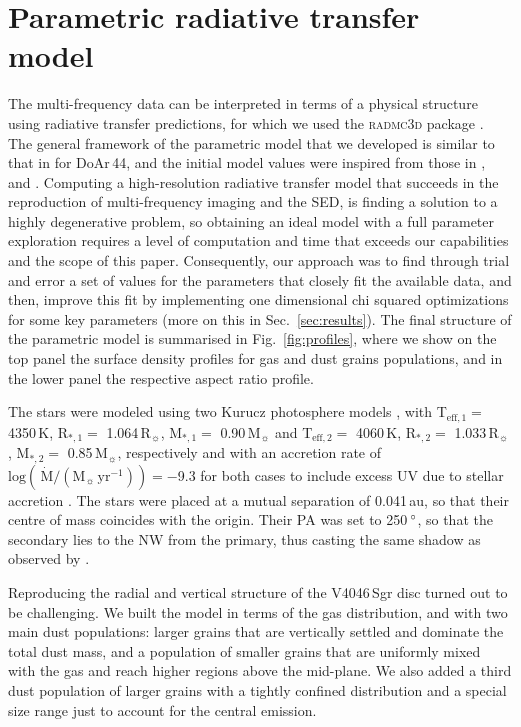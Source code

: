 \documentclass[fleqn,usenatbib,useAMS]{mnras}
\begin{document}
\section{Parametric radiative transfer model} \label{sec:model}

The multi-frequency data can be interpreted in terms of a physical structure using radiative transfer predictions, for which we used the \textsc{radmc3d} package \citep[version 2.0,][]{Dullemond_2012}. The general framework of the parametric model that we developed is similar to that in \citet{2018MNRAS.477.5104C} for DoAr\,44, and the initial model values were inspired from those in \citet{Rosenfeld_2013}, \citet{Ru_z_Rodr_guez_2019} and \citet{2019ApJ...882..160Q}. Computing a high-resolution radiative transfer model that succeeds in the reproduction of multi-frequency imaging and the SED, is finding a solution to a highly degenerative problem, so obtaining an ideal model with a full parameter exploration requires a level of computation and time that exceeds our capabilities and the scope of this paper. Consequently, our approach was to find through trial and error a set of values for the parameters that closely fit the available data, and then, improve this fit by implementing one dimensional chi squared optimizations for some key parameters (more on this in Sec.~\ref{sec:results}). The final structure of the parametric model is summarised in Fig.~\ref{fig:profiles}, where we show on the top panel the surface density profiles for gas and dust grains populations, and in the lower panel the respective aspect ratio profile.

The stars were modeled using two Kurucz photosphere models \citep{1979ApJS...40....1K, 1997A&A...318..841C}, with T$_{\mathrm{eff},1} =$ 4350\,K, R$_{*,1} =$ 1.064\,R$_{\sun}$, M$_{*,1} =$ 0.90\,M$_{\sun}$ and T$_{\mathrm{eff},2} =$ 4060\,K, R$_{*,2} =$ 1.033\,R$_{\sun}$, M$_{*,2} =$ 0.85\,M$_{\sun}$, respectively and with an accretion rate of $\mathrm{log}(\,\dot{\mathrm{M}}/(\mathrm{M}_{\sun}\,\mathrm{yr^{-1}})) = -$9.3 for both cases to include excess UV due to stellar accretion \citep{10.1111/j.1365-2966.2011.19366.x}. The stars were placed at a mutual separation of 0.041\,au, so that their centre of mass coincides with the origin. Their PA was set to 250\,$\hbox{$^\circ$}$, so that the secondary lies to the NW from the primary, thus casting the same shadow as observed by \citet{dOrazi}.

Reproducing the radial and vertical structure of the V4046\,Sgr disc turned out to be challenging. We built the model in terms of the gas distribution, and with two main dust populations: larger grains that are vertically settled and dominate the total dust mass, and a population of smaller grains that are uniformly mixed with the gas and reach higher regions above the mid-plane. We also added a third dust population of larger grains with a tightly confined distribution and a special size range just to account for the central emission.
\end{document}
